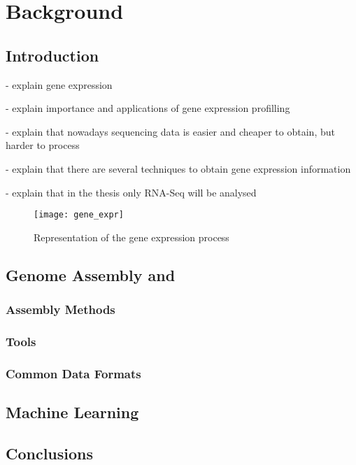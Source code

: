 \chapter{Background} \label{chap:sota}

\section*{}

\section{Introduction}

- explain gene expression

- explain importance and applications of gene expression profilling

- explain that nowadays sequencing data is easier and cheaper to obtain, but
  harder to process

- explain that there are several techniques to obtain gene expression
  information

- explain that in the thesis only RNA-Seq will be analysed

\begin{figure}[t]
  \begin{center}
    \leavevmode
    \texttt{[image: gene\_expr]}
    \caption{Representation of the gene expression process \cite{madprime2006}}
    \label{fig:arch}
  \end{center}
\end{figure}

\section{Genome Assembly and \rnaseq}\label{sec:assembly}

\subsection{Assembly Methods}\label{sec:seqtools}

\subsection{\rnaseq{} Tools}\label{sec:seqtools}

\subsection{Common Data Formats}\label{sec:formats}

\section{Machine Learning}\label{sec:mlearning}

\section{Conclusions}

